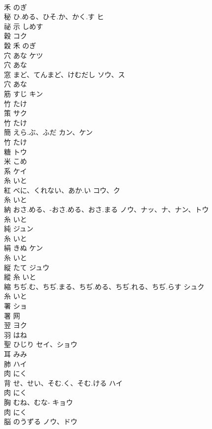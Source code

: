 \documentclass[8pt]{extreport}
\begin{document}
\begin{CJK}{UTF8}{min}
\\	禾		のぎ		
\\	秘	ひ.める、ひそ.か、かく.す	ヒ	
\\	祕	示		しめす		
\\	穀		コク	
\\	穀	禾		のぎ		
\\	穴	あな	ケツ	
\\	穴		あな		
\\	窓	まど、てんまど、けむだし	ソウ、ス	
\\	穴		あな		
\\	筋	すじ	キン	
\\	竹		たけ		
\\	策		サク	
\\	竹		たけ		
\\	簡	えら.ぶ、ふだ	カン、ケン	
\\	竹		たけ		
\\	糖		トウ	
\\	米		こめ		
\\	系		ケイ	
\\	糸		いと		
\\	紅	べに、くれない、あか.い	コウ、ク	
\\	糸		いと		
\\	納	おさ.める、-おさ.める、おさ.まる	ノウ、ナッ、ナ、ナン、トウ	
\\	糸		いと		
\\	純		ジュン	
\\	糸		いと		
\\	絹	きぬ	ケン	
\\	糸		いと		
\\	縦	たて	ジュウ	
\\	縱	糸		いと		
\\	縮	ちぢ.む、ちぢ.まる、ちぢ.める、ちぢ.れる、ちぢ.らす	シュク	
\\	糸		いと		
\\	署		ショ	
\\	署	网				
\\	翌		ヨク	
\\	羽		はね		
\\	聖	ひじり	セイ、ショウ	
\\	耳		みみ		
\\	肺		ハイ	
\\	肉		にく		
\\	背	せ、せい、そむ.く、そむ.ける	ハイ	
\\	肉		にく		
\\	胸	むね、むな-	キョウ	
\\	肉		にく		
\\	脳	のうずる	ノウ、ドウ	

\end{CJK}
\end{document}
